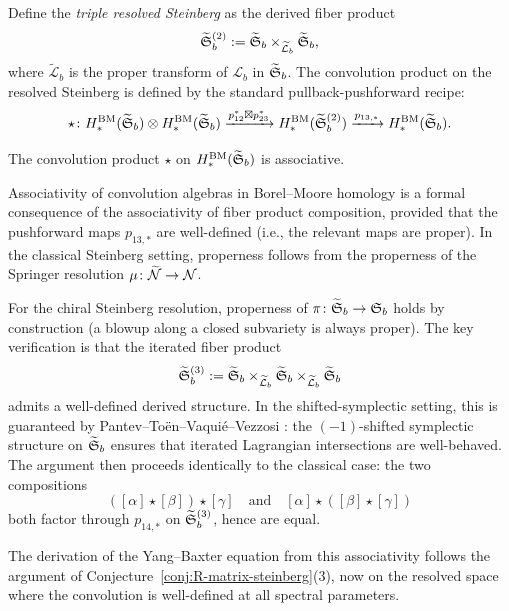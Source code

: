 \begin{construction}
\label{constr:convolution-resolved}
Define the \emph{triple resolved Steinberg} as the derived fiber
product
\[
\widetilde{\mathfrak{S}}_b^{(2)}
:= \widetilde{\mathfrak{S}}_b
\times_{\widetilde{\mathcal{L}}_b}
\widetilde{\mathfrak{S}}_b,
\]
where $\widetilde{\mathcal{L}}_b$ is the proper transform of
$\mathcal{L}_b$ in $\widetilde{\mathfrak{S}}_b$. The convolution
product on the resolved Steinberg is defined by the standard
pullback-pushforward recipe:
\[
\star \colon
H_*^{\mathrm{BM}}(\widetilde{\mathfrak{S}}_b)
\otimes
H_*^{\mathrm{BM}}(\widetilde{\mathfrak{S}}_b)
\xrightarrow{p_{12}^* \boxtimes p_{23}^*}
H_*^{\mathrm{BM}}(\widetilde{\mathfrak{S}}_b^{(2)})
\xrightarrow{p_{13,*}}
H_*^{\mathrm{BM}}(\widetilde{\mathfrak{S}}_b).
\]
\end{construction}

\begin{conjecture}
\label{conj:resolved-associativity}
The convolution product $\star$ on
$H_*^{\mathrm{BM}}(\widetilde{\mathfrak{S}}_b)$ is associative.
\end{conjecture}

\begin{remark}
Associativity of convolution algebras in Borel--Moore homology is a
formal consequence of the associativity of fiber product composition,
provided that the pushforward maps $p_{13,*}$ are well-defined (i.e.,
the relevant maps are proper). In the classical Steinberg setting,
properness follows from the properness of the Springer resolution
$\mu \colon \widetilde{\mathcal{N}} \to \mathcal{N}$.

For the chiral Steinberg resolution, properness of
$\pi \colon \widetilde{\mathfrak{S}}_b \to \mathfrak{S}_b$ holds by
construction (a blowup along a closed subvariety is always proper).
The key verification is that the iterated fiber product
\[
\widetilde{\mathfrak{S}}_b^{(3)}
:= \widetilde{\mathfrak{S}}_b
\times_{\widetilde{\mathcal{L}}_b}
\widetilde{\mathfrak{S}}_b
\times_{\widetilde{\mathcal{L}}_b}
\widetilde{\mathfrak{S}}_b
\]
admits a well-defined derived structure. In the shifted-symplectic
setting, this is guaranteed by Pantev--To\"en--Vaqui\'e--Vezzosi
\cite{PTVV13}: the $(-1)$-shifted symplectic structure on
$\widetilde{\mathfrak{S}}_b$ ensures that iterated Lagrangian
intersections are well-behaved. The argument then proceeds
identically to the classical case: the two compositions
\[
([\alpha] \star [\beta]) \star [\gamma]
\quad\text{and}\quad
[\alpha] \star ([\beta] \star [\gamma])
\]
both factor through $p_{14,*}$ on
$\widetilde{\mathfrak{S}}_b^{(3)}$, hence are equal.

The derivation of the Yang--Baxter equation from this associativity
follows the argument of Conjecture~\ref{conj:R-matrix-steinberg}(3),
now on the resolved space where the convolution is well-defined at
all spectral parameters.
\end{remark}

